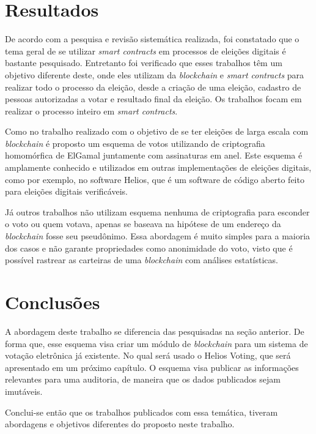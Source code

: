 \documentclass{ufsctex/ufsctex}
\begin{document}
\section{Resultados}

De acordo com a pesquisa e revisão sistemática realizada, foi constatado que o
tema geral de se utilizar \textit{smart contracts} em processos de eleições
digitais é bastante pesquisado. Entretanto foi verificado que esses trabalhos
têm um objetivo diferente deste, onde eles utilizam da \textit{blockchain} e
\textit{smart contracts} para realizar todo o processo da eleição, desde a
criação de uma eleição, cadastro de pessoas autorizadas a votar e resultado
final da eleição. Os trabalhos focam em realizar o processo inteiro em
\textit{smart contracts}.

Como no trabalho realizado com o objetivo de se ter eleições de larga escala
com \textit{blockchain} é proposto um esquema de votos utilizando de
criptografia homomórfica de ElGamal juntamente com assinaturas em anel.
\cite{WANG2018234} Este esquema é amplamente conhecido e utilizados em outras
implementações de eleições digitais, como por exemplo, no software Helios, que
é um software de código aberto feito para eleições digitais verificáveis.

Já outros trabalhos não utilizam esquema nenhuma de criptografia para esconder
o voto ou quem votava, apenas se baseava na hipótese de um endereço da
\textit{blockchain} fosse seu pseudônimo. \cite{Yavuz2018} Essa abordagem é
muito simples para a maioria dos casos e não garante propriedades como
anonimidade do voto, visto que é possível rastrear as carteiras de uma
\textit{blockchain} com análises estatísticas. \cite{Kosy2014}


\section{Conclusões}

A abordagem deste trabalho se diferencia das pesquisadas na seção anterior. De
forma que, esse esquema visa criar um módulo de \textit{blockchain} para um
sistema de votação eletrônica já existente. No qual será usado o Helios Voting,
que será apresentado em um próximo capítulo. O esquema visa publicar as
informações relevantes para uma auditoria, de maneira que os dados publicados
sejam imutáveis.

Conclui-se então que os trabalhos publicados com essa temática, tiveram
abordagens e objetivos diferentes do proposto neste trabalho. 
\end{document}
